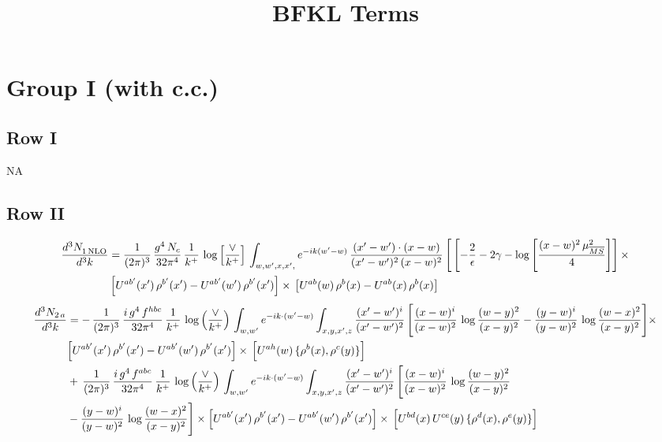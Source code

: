 \documentclass[9pt]{article}
\title{BFKL Terms}
\author{}
\date{}
\numberwithin{equation}{section}
\begin{document}
\maketitle
\section{Group I (with c.c.)}
\subsection{Row I}
\textsc{NA}
\subsection{Row II}
\begin{align}
     \frac{d^{3}N_{1\,\rm NLO}^{\rm}}{d^{3}k} &  = \frac{1}{(2\pi)^{3}}\, \frac{g^{4}\,N_{c}}{32\pi^{4}}\,\frac{1}{k^{+}}\,\log{\left[\frac{\vee}{k^{+}}\right]}\, \int_{w, w',x,x',} e^{-ik(w^\prime-w)}\, \frac{(x'-w')\cdot (x-w)}{(x'-w')^{2}\, (x-w)^{2}}\, \Bigg[\left[-\frac{2}{\epsilon}-2\gamma-\log{\left[\frac{(x-w)^{2}\,\mu^{2}_{\overline{MS}}}{4}\right]}\right]\times\notag \\ &  \left[U^{ab'}(x')\,\rho^{b'}(x') - U^{ab'}(w')\,\rho^{b'}(x')\right]\times\,\left[U^{ab}(w)\,\rho^{b}(x) - U^{ab}(x)\,\rho^{b}(x)\right]
\end{align}
\begin{align}
    \frac{d^{3}N_{2\,a}}{d^{3}k} & =  -\,\frac{1}{(2\pi)^{3}}\,\frac{i\,g^{4}\,f^{hbc}}{32\pi^{4}}\,\frac{1}{k^{+}}\,\log\left(\frac{\vee}{k^{+}}\right)\,
\int_{w,w'} e^{-ik\cdot(w'-w)}\int_{x,y,x',z}\frac{(x'-w')^{i}}{(x'-w')^{2}}\,\Bigg[\frac{(x-w)^{i}}{(x-w)^{2}}\,\log\frac{(w-y)^{2}}{(x-y)^{2}}-\frac{(y-w)^{i}}{(y-w)^{2}}\,\log\frac{(w-x)^{2}}{(x-y)^{2}}\Bigg]\times\notag \\ & \Big[U^{ab'}(x')\,\rho^{b'}(x')-U^{ab'}(w')\,\rho^{b'}(x')\Big]\times\, \Big[U^{ah}(w)\,\{\rho^{b}(x),\rho^{c}(y)\}\Big]\notag \\ & +\,\frac{1}{(2\pi)^{3}}\,\frac{i\,g^{4}\,f^{abc}}{32\pi^{4}}\,\frac{1}{k^{+}}\, \log\left(\frac{\vee}{k^{+}}\right)\,
\int_{w,w'} e^{-ik\cdot(w'-w)}\int_{x,y,x',z}\frac{(x'-w')^{i}}{(x'-w')^{2}}\,\Bigg[\frac{(x-w)^{i}}{(x-w)^{2}}\,\log\frac{(w-y)^{2}}{(x-y)^{2}}\notag \\ & -\frac{(y-w)^{i}}{(y-w)^{2}}\,\log\frac{(w-x)^{2}}{(x-y)^{2}}\Bigg]\times \Big[U^{ab'}(x')\,\rho^{b'}(x')-U^{ab'}(w')\,\rho^{b'}(x')\Big]\times\, \Big[U^{bd}(x)\,U^{ce}(y)\,\{\rho^{d}(x),\rho^{e}(y)\}\Big]
\end{align}
\end{document}
